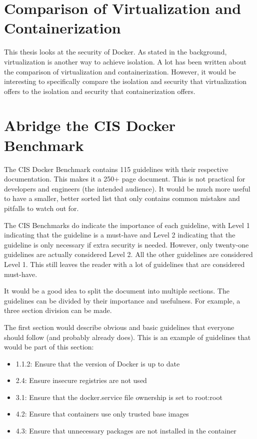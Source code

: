 \section{Comparison of Virtualization and Containerization}
This thesis looks at the security of Docker. As stated in the background, virtualization is another way to achieve isolation. A lot has been written about the comparison of virtualization and containerization\cite{Virtualization-vs-Containerization-to-Support-PaaS}\cite{Hypervisor-vs-Lightweight-Virtualization}\cite{Updated-Performance-Comparison-Virtual-Machines-Containers}.
However, it would be interesting to specifically compare the isolation and security that virtualization offers to the isolation and security that containerization offers.

\section{Abridge the CIS Docker Benchmark}\label{futurework:CIS}
The CIS Docker Benchmark contains 115 guidelines with their respective documentation.
This makes it a 250+ page document. This is not practical for developers and engineers (the intended audience). It would be much more useful to have a smaller, better sorted list that only contains common mistakes and pitfalls to watch out for.

\medskip

The CIS Benchmarks do indicate the importance of each guideline, with Level 1 indicating that the guideline is a must-have and Level 2 indicating that the guideline is only necessary if extra security is needed. However, only twenty-one guidelines are actually considered Level 2. All the other guidelines are considered Level 1. This still leaves the reader with a lot of guidelines that are considered must-have.

\medskip

It would be a good idea to split the document into multiple sections. The guidelines can be divided by their importance and usefulness. For example, a three section division can be made.

\medskip

The first section would describe obvious and basic guidelines that everyone should follow (and probably already does). This is an example of guidelines that would be part of this section:
\begin{itemize}
    \item 1.1.2: Ensure that the version of Docker is up to date
    \item 2.4: Ensure insecure registries are not used
    \item 3.1: Ensure that the docker.service file ownership is set to root:root
    \item 4.2: Ensure that containers use only trusted base images
    \item 4.3: Ensure that unnecessary packages are not installed in the container
\end{itemize}

